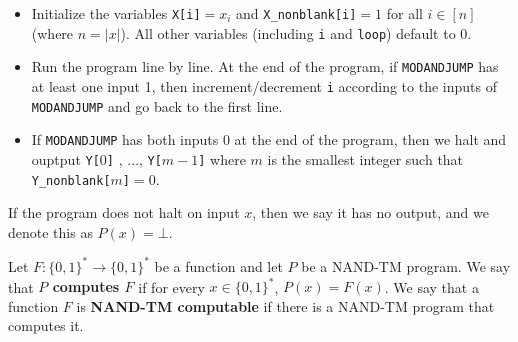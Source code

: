 \documentclass[11pt]{article}
\theoremstyle{definition}
\theoremstyle{remark}
\begin{document}
\begin{itemize}
\item Initialize the variables \texttt{X[i]}$=x_i$ and \texttt{X\_nonblank[i]}$=1$ for all $i\in [n]$ (where $n=|x|$). All other variables (including \texttt{i} and \texttt{loop}) default to $0$.

\item Run the program line by line. At the end of the program, if \texttt{MODANDJUMP} has at least one input 1, then increment/decrement \texttt{i} according to the inputs of \texttt{MODANDJUMP} and go back to the first line.

\item If \texttt{MODANDJUMP} has both inputs 0 at the end of the program, then we halt and ouptput \texttt{Y[}$0$\texttt{]} , $\ldots$, \texttt{Y[}$m-1$\texttt{]} where $m$ is the smallest integer such that \texttt{Y\_nonblank[}$m$\texttt{]}$=0$.
\end{itemize}

If the program does not halt on input $x$, then we say it has no output, and we denote this as $P(x) = \bot$.

Let $F:\{0,1\}^* \rightarrow \{0,1\}^*$ be a function and let $P$ be a NAND-TM program. We say that \textbf{$P$ computes $F$} if for every $x\in \{0,1\}^*$, $P(x)=F(x)$. We say that a function $F$ is \textbf{NAND-TM computable} if there is a NAND-TM program that computes it.
\end{document}
